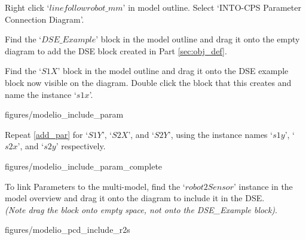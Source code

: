 \documentclass[11pt,a4paper]{../tutorial}
\begin{document}
\begin{instructions}

\item Right click `$linefollowrobot\_mm$' in model outline. Select `INTO-CPS \menusep Parameter Connection Diagram'.

\item Find the `$DSE\_Example$' block in the model outline and drag it onto the empty diagram to add the DSE block created in Part \ref{sec:obj_def}.

\item \label{add_par} Find the `$S1X$' block in the model outline and drag it onto the DSE example block now visible on the diagram. Double click the block that this creates and name the instance `$s1x$'.

\begin{center}
\begin{annotation}[width=0.7\linewidth]{figures/modelio_include_param}
    \end{annotation}
\end{center}

\newpage

\item Repeat \ref{add_par} for `$S1Y$', `$S2X$', and `$S2Y$', using the instance names `$s1y$', `$s2x$', and `$s2y$' respectively.

\begin{center}
\begin{annotation}[width=0.7\linewidth]{figures/modelio_include_param_complete}
    \end{annotation}
\end{center}


\item To link Parameters to the multi-model, find the `$robot2Sensor$' instance in the model overview and drag it onto the diagram to include it in the DSE. \\ \textit{(Note drag the block onto empty space, not onto the DSE\_Example block)}.

\begin{center}
\begin{annotation}[width=0.7\linewidth]{figures/modelio_pcd_include_r2s}
    \end{annotation}
\end{center}


\end{instructions}
\end{document}
